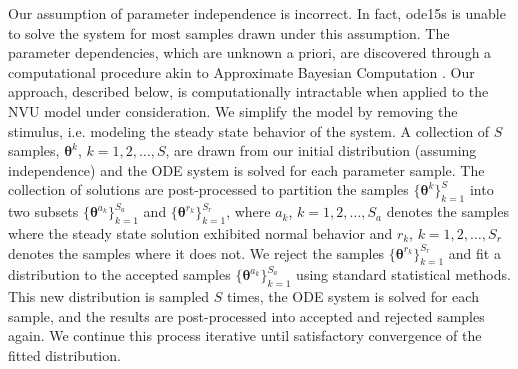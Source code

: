 Our assumption of parameter independence is incorrect. In fact, ode15s is unable to solve the system for most samples drawn under this assumption. The parameter dependencies, which are unknown a priori, are discovered through a computational procedure akin to Approximate Bayesian Computation \cite{abc}. Our approach, described below, is computationally intractable when applied to the NVU model under consideration. We simplify the model by removing the stimulus, i.e. modeling the steady state behavior of the system. A collection of $S$ samples, $\boldsymbol{\theta}^k$, $k=1,2,\dots,S$, are drawn from our initial distribution (assuming independence) and the ODE system is solved for each parameter sample. The collection of solutions are post-processed to partition the samples $\{\boldsymbol{\theta}^k\}_{k=1}^S$ into two subsets $\{\boldsymbol{\theta}^{a_k}\}_{k=1}^{S_a}$ and $\{\boldsymbol{\theta}^{r_k}\}_{k=1}^{S_r}$, where $a_k$, $k=1,2,\dots,S_a$ denotes the samples where the steady state solution exhibited normal behavior and $r_k$, $k=1,2,\dots,S_r$ denotes the samples where it does not. We reject the samples $\{\boldsymbol{\theta}^{r_k}\}_{k=1}^{S_r}$ and fit a distribution to the accepted samples $\{\boldsymbol{\theta}^{a_k}\}_{k=1}^{S_a}$ using standard statistical methods. This new distribution is sampled $S$ times,  the ODE system is solved for each sample, and the results are post-processed into accepted and rejected samples again. We continue this process iterative until satisfactory convergence of the fitted distribution.

